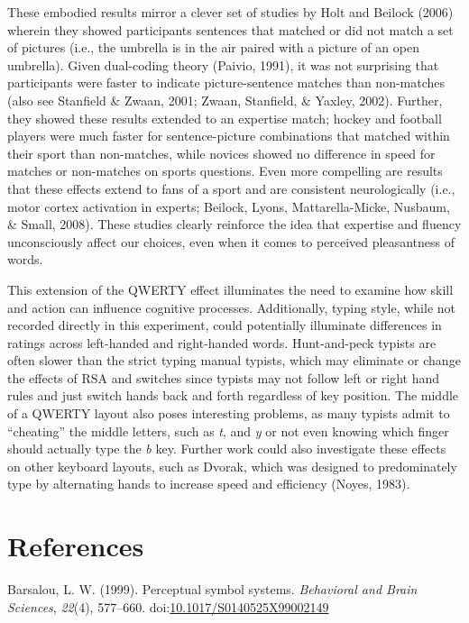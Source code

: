 \documentclass[english,man]{apa6}
\theoremstyle{definition}
\theoremstyle{definition}
\theoremstyle{definition}
\theoremstyle{remark}
\begin{document}
These embodied results mirror a clever set of studies by Holt and
Beilock (2006) wherein they showed participants sentences that matched
or did not match a set of pictures (i.e., the umbrella is in the air
paired with a picture of an open umbrella). Given dual-coding theory
(Paivio, 1991), it was not surprising that participants were faster to
indicate picture-sentence matches than non-matches (also see Stanfield
\& Zwaan, 2001; Zwaan, Stanfield, \& Yaxley, 2002). Further, they showed
these results extended to an expertise match; hockey and football
players were much faster for sentence-picture combinations that matched
within their sport than non-matches, while novices showed no difference
in speed for matches or non-matches on sports questions. Even more
compelling are results that these effects extend to fans of a sport and
are consistent neurologically (i.e., motor cortex activation in experts;
Beilock, Lyons, Mattarella-Micke, Nusbaum, \& Small, 2008). These
studies clearly reinforce the idea that expertise and fluency
unconsciously affect our choices, even when it comes to perceived
pleasantness of words.

This extension of the QWERTY effect illuminates the need to examine how
skill and action can influence cognitive processes. Additionally, typing
style, while not recorded directly in this experiment, could potentially
illuminate differences in ratings across left-handed and right-handed
words. Hunt-and-peck typists are often slower than the strict typing
manual typists, which may eliminate or change the effects of RSA and
switches since typists may not follow left or right hand rules and just
switch hands back and forth regardless of key position. The middle of a
QWERTY layout also poses interesting problems, as many typists admit to
\enquote{cheating} the middle letters, such as \emph{t}, and \emph{y} or
not even knowing which finger should actually type the \emph{b} key.
Further work could also investigate these effects on other keyboard
layouts, such as Dvorak, which was designed to predominately type by
alternating hands to increase speed and efficiency (Noyes, 1983).

\newpage

\section{References}\label{references}

\setlength{\parindent}{-0.5in} \setlength{\leftskip}{0.5in}

\hypertarget{refs}{}
\hypertarget{ref-Barsalou1999}{}
Barsalou, L. W. (1999). Perceptual symbol systems. \emph{Behavioral and
Brain Sciences}, \emph{22}(4), 577--660.
doi:\href{https://doi.org/10.1017/S0140525X99002149}{10.1017/S0140525X99002149}
\end{document}
